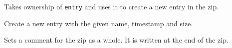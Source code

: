 \label{wxzipoutputstreamputnextentry}


Takes ownership of {\tt entry} and uses it to create a new entry
in the zip. 


Create a new entry with the given name, timestamp and size.


\label{wxzipoutputstreamsetcomment}


Sets a comment for the zip as a whole. It is written at the end of the
zip.

